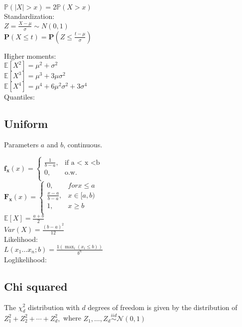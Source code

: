 $\mathbb{P}(|X|>x) = 2\mathbb{P}(X>x)$\\

Standardization:\\

$Z= \frac{X-\mu}{\sigma} \sim N(0,1)$\\

$\mathbf{P}\left(X\leq t\right) = \displaystyle \mathbf{P}\left(Z\leq \frac{t-\mu}{\sigma}\right)$

Higher moments:\\

$\mathbb{E}[X^2] = \mu^2 + \sigma^2$\\
$\mathbb{E}[X^3] = \mu^3 + 3\mu\sigma^2$\\
$\mathbb{E}[X^4] = \mu^4 + 6\mu^2\sigma^2 +3\sigma^4$\\

Quantiles:\\

\subsection*{Uniform}

Parameters $a$ and $b$, continuous.

$ \mathbf{f_x}(x)=
	\begin{cases}
		 \frac{1}{b-a},&\text{if a < x <b}\\
		0,&\text{o.w.}\\
	\end{cases}
$\\

$ \mathbf{F_x}(x)=
	\begin{cases}
		 0,&for x \leq a\\
		 \frac{x-a}{b-a},& x \in [a,b)\\
		1,&x \geq b\\
	\end{cases}
$\\


$\mathbb{E}[X]=\frac{a+b}{2}$\\
$Var(X)=\frac{(b-a)^2}{12}$\\

Likelihood:\\
$L(x_1\dots x_n;b)=\frac{1(\max_i (x_i \leq b))} {b^n}$\\

Loglikelihood:\\


\subsection*{Chi squared}
The $\chi _ d^2$ distribution with $d$ degrees of freedom is given by the distribution of $Z_1^2 + Z_2^2 + \cdots + Z_ d^2,$ where $Z_1, \ldots , Z_ d \stackrel{iid}{\sim } \mathcal{N}(0,1)$

